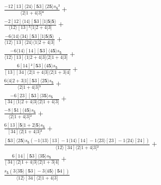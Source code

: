 \documentclass[varwidth, border=5pt]{standalone}
\begin{document}
\begin{my}
$\begin{gathered}
\scriptscriptstyle\frac{-12[13]⟨24⟩[𝟓3]⟨2𝟓⟩s_{𝟓}²}{⟨2|1+4|3]⁴} +\\
\scriptscriptstyle\frac{-2[12]⟨14⟩[𝟓3][1|𝟓|𝟓⟩}{⟨12⟩[13]²⟨1|2+4|3]} +\\
\scriptscriptstyle\frac{-6⟨14⟩⟨34⟩[𝟓3][1|𝟓|𝟓⟩}{⟨12⟩[13]⟨24⟩⟨1|2+4|3]} +\\
\scriptscriptstyle\frac{-6⟨14⟩[14][𝟓3]⟨4𝟓⟩s_{𝟓}}{⟨12⟩[13]⟨1|2+4|3]⟨2|1+4|3]} +\\
\scriptscriptstyle\frac{6[14]²[𝟓3]⟨4𝟓⟩s_{𝟓}}{[13][34]⟨2|1+4|3]⟨2|1+3|4]} +\\
\scriptscriptstyle\frac{6⟨4|2+3|1][𝟓3]⟨2𝟓⟩s_{𝟓}}{⟨2|1+4|3]³} +\\
\scriptscriptstyle\frac{-6[23][𝟓3]⟨3𝟓⟩s_{𝟓}}{[34]⟨1|2+4|3]⟨2|1+4|3]} +\\
\scriptscriptstyle\frac{-8[𝟓1]⟨4𝟓⟩s_{𝟓}}{⟨2|1+4|3]²} +\\
\scriptscriptstyle\frac{6[13][𝟓|1+2|𝟓⟩s_{𝟓}}{[34]⟨2|1+4|3]²} +\\
\scriptscriptstyle\frac{[𝟓3]⟨2𝟓⟩s_{𝟓}(-1⟨13⟩[13]-1⟨14⟩[14]-1⟨23⟩[23]-1⟨24⟩[24])}{⟨12⟩[34]⟨2|1+4|3]²} +\\
\scriptscriptstyle\frac{6[14][𝟓3]⟨3𝟓⟩s_{𝟓}}{[34]⟨2|1+4|3]⟨2|1+3|4]} +\\
\scriptscriptstyle\frac{s_{𝟓}(3⟨3𝟓⟩[𝟓3]-3⟨4𝟓⟩[𝟓4])}{⟨12⟩[34]⟨2|1+4|3]} \phantom{+}
\end{gathered}$
\end{my}
\end{document}
